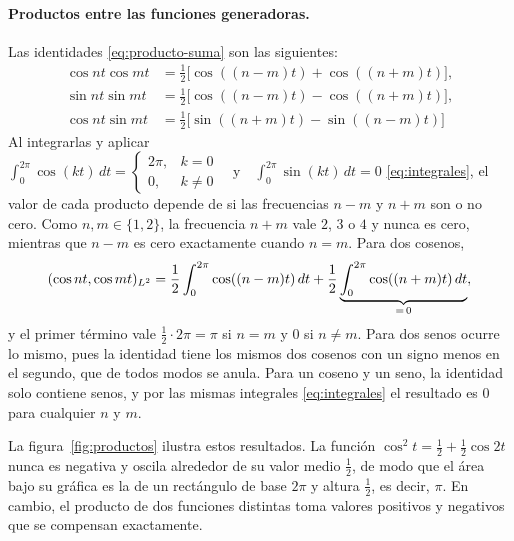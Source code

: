\paragraph{Productos entre las funciones generadoras.}
Las identidades \eqref{eq:producto-suma} son las siguientes:
\begin{align*}
\cos nt\cos mt&=\tfrac12\bigl[\cos((n-m)t)+\cos((n+m)t)\bigr],\\
\sin nt\sin mt&=\tfrac12\bigl[\cos((n-m)t)-\cos((n+m)t)\bigr],\\
\cos nt\sin mt&=\tfrac12\bigl[\sin((n+m)t)-\sin((n-m)t)\bigr]
\end{align*}
Al integrarlas y aplicar $\int_0^{2\pi}\cos(kt)\,dt=\begin{cases}2\pi,&k=0\\0,&k\neq0\end{cases}\quad\text{y}\quad \int_0^{2\pi}\sin(kt)\,dt=0$ \eqref{eq:integrales}, el valor
de cada producto depende de si las frecuencias $n-m$ y $n+m$ son o no cero. Como
$n,m\in\{1,2\}$, la frecuencia $n+m$ vale $2$, $3$ o $4$ y nunca es cero, mientras que $n-m$ es
cero exactamente cuando $n=m$. Para dos cosenos,
\[
  (\cos nt,\cos mt)_{L^2}
  =\frac12\int_0^{2\pi}\cos((n-m)t)\,dt+\frac12\underbrace{\int_0^{2\pi}\cos((n+m)t)\,dt}_{=\,0},
\]
y el primer término vale $\frac12\cdot 2\pi=\pi$ si $n=m$ y $0$ si $n\ne m$. Para dos senos
ocurre lo mismo, pues la identidad tiene los mismos dos cosenos con un signo menos en el
segundo, que de todos modos se anula. Para un coseno y un seno, la identidad solo contiene
senos, y por las mismas integrales \eqref{eq:integrales} el resultado es $0$ para cualquier $n$ y $m$.

La figura~\ref{fig:productos} ilustra estos resultados. La función
$\cos^2 t=\frac12+\frac12\cos 2t$ nunca es negativa y oscila alrededor de su valor medio
$\frac12$, de modo que el área bajo su gráfica es la de un rectángulo de base $2\pi$ y altura
$\frac12$, es decir, $\pi$. En cambio, el producto de dos funciones distintas toma valores
positivos y negativos que se compensan exactamente.

